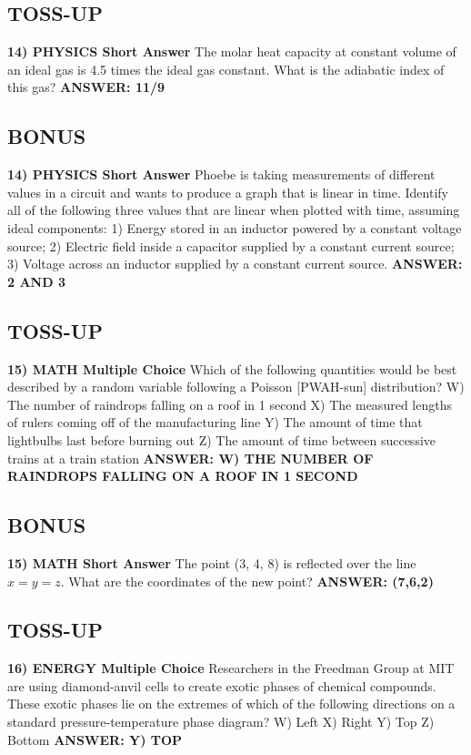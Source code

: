 \documentclass{article}
\begin{document}
\newpage

\subsection*{TOSS-UP}
\textbf{14) PHYSICS Short Answer} The molar heat capacity at constant volume of an ideal gas is 4.5 times the ideal gas constant. What is the adiabatic index of this gas?
\textbf{ANSWER: 11/9}

\subsection*{BONUS}
\textbf{14) PHYSICS Short Answer} Phoebe is taking measurements of different values in a circuit and wants to produce a graph that is linear in time. Identify all of the following three values that are linear when plotted with time, assuming ideal components: 1) Energy stored in an inductor powered by a constant voltage source; 2) Electric field inside a capacitor supplied by a constant current source; 3) Voltage across an inductor supplied by a constant current source.
\textbf{ANSWER: 2 AND 3}

\subsection*{TOSS-UP}
\textbf{15) MATH Multiple Choice} Which of the following quantities would be best described by a random variable following a Poisson [PWAH-sun] distribution?
W) The number of raindrops falling on a roof in 1 second
X) The measured lengths of rulers coming off of the manufacturing line
Y) The amount of time that lightbulbs last before burning out
Z) The amount of time between successive trains at a train station
\textbf{ANSWER: W) THE NUMBER OF RAINDROPS FALLING ON A ROOF IN 1 SECOND}

\subsection*{BONUS}
\textbf{15) MATH Short Answer} The point (3, 4, 8) is reflected over the line $x=y=z$. What are the coordinates of the new point?
\textbf{ANSWER: (7,6,2)}

\newpage

\subsection*{TOSS-UP}
\textbf{16) ENERGY Multiple Choice} Researchers in the Freedman Group at MIT are using diamond-anvil cells to create exotic phases of chemical compounds. These exotic phases lie on the extremes of which of the following directions on a standard pressure-temperature phase diagram?
W) Left
X) Right
Y) Top
Z) Bottom
\textbf{ANSWER: Y) TOP}
\end{document}
